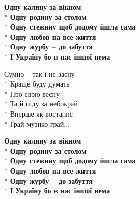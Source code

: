 \begin{minipage}{\linewidth}
\hspace*{1.5em}\textbf{Одну калину за вікном}\\*
\hspace*{1.5em}\textbf{Одну родину за столом}\\*
\hspace*{1.5em}\textbf{Одну стежину щоб додому йшла сама}\\*
\hspace*{1.5em}\textbf{Одну любов на все життя}\\*
\hspace*{1.5em}\textbf{Одну журбу – до забуття}\\*
\hspace*{1.5em}\textbf{І Україну бо в нас іншої нема}\\
\end{minipage}\par\medskip\nobreak

\medskip

\begin{minipage}{\linewidth}
Сумно – так і не засну\\*
Краще буду думать\\*
Про свою весну\\*
Та й піду за небокрай\\*
Вперше як востаннє\\*
Грай музико грай...\\
\end{minipage}\par\medskip\nobreak

\medskip

\begin{minipage}{\linewidth}
\hspace*{1.5em}\textbf{Одну калину за вікном}\\*
\hspace*{1.5em}\textbf{Одну родину за столом}\\*
\hspace*{1.5em}\textbf{Одну стежину щоб додому йшла сама}\\*
\hspace*{1.5em}\textbf{Одну любов на все життя}\\*
\hspace*{1.5em}\textbf{Одну журбу – до забуття}\\*
\hspace*{1.5em}\textbf{І Україну бо в нас іншої нема}\\
\end{minipage}

